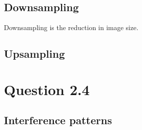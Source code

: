 \documentclass{article}
\begin{document}
\subsection*{Downsampling}
Downsampling is the reduction in image size.
\subsection*{Upsampling}

\section*{Question 2.4}
\subsection*{Interference patterns}
\subsection*{}
\end{document}

